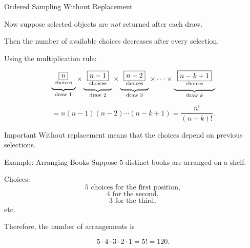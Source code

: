 \begin{frame}{Ordered Sampling Without Replacement}

Now suppose selected objects are \emph{not} returned after each draw.

\vspace{0.25cm}

Then the number of available choices decreases after every selection.

\vspace{0.35cm}

Using the multiplication rule:

\[
\underbrace{
\begin{array}{c}
\fbox{$n$}\\[-1mm]
{\text{\scriptsize choices}}
\end{array}
}_{\text{draw }1}
\times
\underbrace{
\begin{array}{c}
\fbox{$n-1$}\\[-1mm]
{\text{\scriptsize choices}}
\end{array}
}_{\text{draw }2}
\times
\underbrace{
\begin{array}{c}
\fbox{$n-2$}\\[-1mm]
{\text{\scriptsize choices}}
\end{array}
}_{\text{draw }3}
\times
\cdots
\times
\underbrace{
\begin{array}{c}
\fbox{$n-k+1$}\\[-1mm]
{\text{\scriptsize choices}}
\end{array}
}_{\text{draw }k}
\]

\[
= n(n-1)(n-2)\cdots(n-k+1)=\frac{n!}{(n-k)!}.
\]

\vspace{0.25cm}

\begin{keybox}{Important}
Without replacement means that the choices depend on previous selections.
\end{keybox}

\end{frame}













\begin{frame}{Example: Arranging Books}
Suppose $5$ distinct books are arranged on a shelf.

\vspace{0.25cm}

Choices:
\[
5 \text{ choices for the first position},
\]
\[
4 \text{ for the second},
\]
\[
3 \text{ for the third},
\]
etc.

Therefore, the number of arrangements is

\[
5\cdot4\cdot3\cdot2\cdot1 = 5! = 120.
\]

\end{frame}

